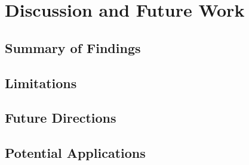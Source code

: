\chapter{Discussion and Future Work}
\section{Summary of Findings}
\section{Limitations}
\section{Future Directions}
\section{Potential Applications}




